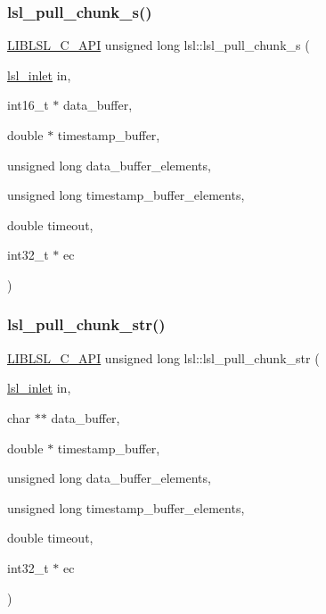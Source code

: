 \mbox{\label{namespacelsl_a577a886ca87effb6b93a295466b9c933}} 
\subsubsection{\texorpdfstring{lsl\+\_\+pull\+\_\+chunk\+\_\+s()}{lsl\_pull\_chunk\_s()}}
{\footnotesize\ttfamily \hyperlink{lsl__cpp_8h_aafd0ef1813e8be84a1420c4f1df64615}{L\+I\+B\+L\+S\+L\+\_\+\+C\+\_\+\+A\+PI} unsigned long lsl\+::lsl\+\_\+pull\+\_\+chunk\+\_\+s (\begin{DoxyParamCaption}\item[{\hyperlink{namespacelsl_a884a3363cfcba75d7ce8f00c1c4c54f1}{lsl\+\_\+inlet}}]{in,  }\item[{int16\+\_\+t $\ast$}]{data\+\_\+buffer,  }\item[{double $\ast$}]{timestamp\+\_\+buffer,  }\item[{unsigned long}]{data\+\_\+buffer\+\_\+elements,  }\item[{unsigned long}]{timestamp\+\_\+buffer\+\_\+elements,  }\item[{double}]{timeout,  }\item[{int32\+\_\+t $\ast$}]{ec }\end{DoxyParamCaption})}

\mbox{\label{namespacelsl_aeac6202687776ae5d0155226869237d0}} 
\subsubsection{\texorpdfstring{lsl\+\_\+pull\+\_\+chunk\+\_\+str()}{lsl\_pull\_chunk\_str()}}
{\footnotesize\ttfamily \hyperlink{lsl__cpp_8h_aafd0ef1813e8be84a1420c4f1df64615}{L\+I\+B\+L\+S\+L\+\_\+\+C\+\_\+\+A\+PI} unsigned long lsl\+::lsl\+\_\+pull\+\_\+chunk\+\_\+str (\begin{DoxyParamCaption}\item[{\hyperlink{namespacelsl_a884a3363cfcba75d7ce8f00c1c4c54f1}{lsl\+\_\+inlet}}]{in,  }\item[{char $\ast$$\ast$}]{data\+\_\+buffer,  }\item[{double $\ast$}]{timestamp\+\_\+buffer,  }\item[{unsigned long}]{data\+\_\+buffer\+\_\+elements,  }\item[{unsigned long}]{timestamp\+\_\+buffer\+\_\+elements,  }\item[{double}]{timeout,  }\item[{int32\+\_\+t $\ast$}]{ec }\end{DoxyParamCaption})}

